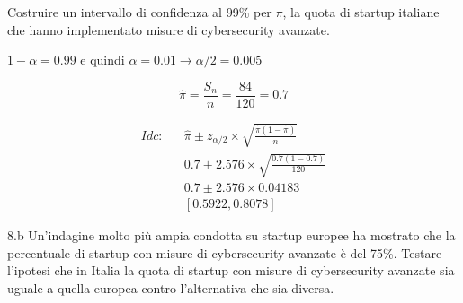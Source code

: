 \documentclass[
  11pt,
]{book}
\theoremstyle{mytheoremstyle}
\theoremstyle{mydefstyle}
\newenvironment{sol}
  {
  \begin{tcolorbox}[enhanced,breakable,arc=0.1mm,boxrule=1pt,colback=white,colframe=iblue,
  title=\bf \fontfamily{lmss}\selectfont \hspace{.5 cm} Soluzione,drop fuzzy shadow]

}{
\end{tcolorbox}
  }
\begin{document}
Costruire un intervallo di confidenza al 99\% per \(\pi\), la quota di startup italiane che hanno implementato misure di cybersecurity avanzate.

\begin{sol}
\(1-\alpha =0.99\) e quindi \(\alpha=0.01\rightarrow \alpha/2=0.005\)

\[
  \hat\pi = \frac{S_n}n = \frac{ 84 }{ 120 }= 0.7 
\]

\begin{eqnarray*}
  Idc: & &  \hat\pi \pm  z_{\alpha/2} \times \sqrt{\frac{\hat\pi(1-\hat\pi)}{n}} \\
     & &  0.7 \pm  2.576 \times \sqrt{\frac{ 0.7 (1- 0.7 )}{ 120 }} \\
     & &  0.7 \pm  2.576 \times  0.04183 \\
     & & [ 0.5922 ,  0.8078 ]
\end{eqnarray*}

\end{sol}

8.b Un'indagine molto più ampia condotta su startup europee ha mostrato che la percentuale di startup con misure di cybersecurity avanzate è del 75\%. Testare l'ipotesi che in Italia la quota di startup con misure di cybersecurity avanzate sia uguale a quella europea contro l'alternativa che sia diversa.
\end{document}
